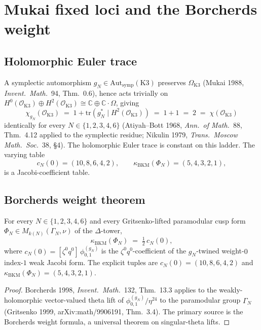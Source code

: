 \providecommand{\BKM}{\mathrm{BKM}}
\providecommand{\ch}{\mathrm{ch}}
\providecommand{\cat}{\mathrm{cat}}
\providecommand{\fib}{\mathrm{fiber}}
\providecommand{\cO}{\mathcal{O}}
\providecommand{\K}{\mathrm{K3}}
\providecommand{\symp}{\mathrm{symp}}

\section*{Mukai fixed loci and the Borcherds weight}
\label{wn:sec:mukai-fixed-loci-borcherds-weight}

\subsection*{Holomorphic Euler trace}

A symplectic automorphism $g_N \in \mathrm{Aut}_{\symp}(\K)$ preserves
$\Omega_{\K}$ (Mukai 1988, \emph{Invent.\ Math.}~94, Thm.~0.6), hence
acts trivially on $H^0(\cO_{\K}) \oplus H^2(\cO_{\K}) \cong \mathbb{C}
\oplus \mathbb{C}\cdot\Omega$, giving
\[
  \chi_{g_N}(\cO_{\K}) \;=\; 1 + \mathrm{tr}(g_N^* \mid H^2(\cO_{\K}))
  \;=\; 1 + 1 \;=\; 2 \;=\; \chi(\cO_{\K})
\]
identically for every $N \in \{1,2,3,4,6\}$ (Atiyah--Bott 1968,
\emph{Ann.\ of Math.}~88, Thm.~4.12 applied to the symplectic residue;
Nikulin 1979, \emph{Trans.\ Moscow Math.\ Soc.}~38, \S4).
The holomorphic Euler trace is constant on this ladder.  The varying
table
\[
  c_N(0)=(10,8,6,4,2),\qquad
  \kappa_{\BKM}(\Phi_N)=(5,4,3,2,1),
\]
is a Jacobi-coefficient table.

\subsection*{Borcherds weight theorem}

\begin{theorem}
\label{wn:thm:mukai-fixed-loci-borcherds}
For every $N \in \{1,2,3,4,6\}$ and every Gritsenko-lifted paramodular
cusp form $\Phi_N \in M_{k(N)}(\Gamma_N, \nu)$ of the
$\Delta$-tower,
\[
  \kappa_{\BKM}(\Phi_N) \;=\; \tfrac{1}{2}\,c_N(0),
\]
where $c_N(0) = [\zeta^0 q^0]\,\phi^{(g_N)}_{0,1}$ is the
$\zeta^0 q^0$-coefficient of the $g_N$-twined weight-$0$ index-$1$
weak Jacobi form. The explicit tuples are
$c_N(0) = (10, 8, 6, 4, 2)$ and
$\kappa_{\BKM}(\Phi_N) = (5, 4, 3, 2, 1)$.
\end{theorem}
\begin{proof}
Borcherds 1998, \emph{Invent.\ Math.}~132, Thm.~13.3 applies to the
weakly-holomorphic vector-valued theta lift of
$\phi^{(g_N)}_{0,1}/\eta^{24}$ to the paramodular group $\Gamma_N$
(Gritsenko 1999, arXiv:math/9906191, Thm.~3.4). The primary source is
the Borcherds weight formula, a universal theorem on singular-theta
lifts.
\end{proof}

